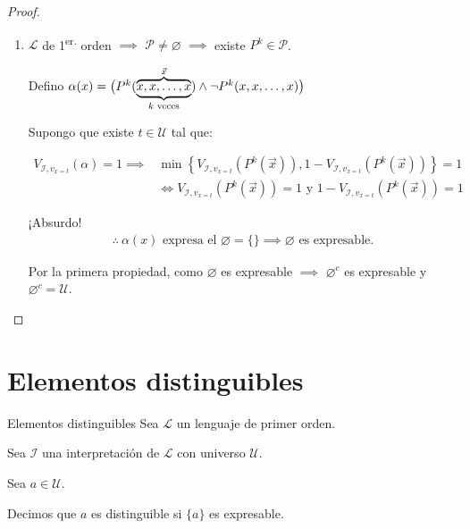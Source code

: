 \begin{proof}
\begin{enumerate}
            \item $\mathcal{L}$ de 1\textsuperscript{er.} orden $\implies$
                $\mathcal{P} \neq \varnothing$ $\implies$ existe 
                $P^k \in \mathcal{P}$.

                Defino $\alpha(x) = \big(
                    P^k ( \overbrace{%
                    \underbrace{x,x,\dotsc,x}_{k\text{ veces}}}^{\vec{x}} )
                    \wedge 
                    \neg P^k (x, x, \dotsc,x) \big)$

                Supongo que existe $t \in \mathcal{U}$ tal que:

                \begin{align*}
                    V_{\mathcal{I}, v_{x=t}}(\alpha)=1 \implies&
                    \min{\left\{ V_{\mathcal{I}, v_{x=t}} \left(P^k(\vec{x})\right), 
                    1 - V_{\mathcal{I}, v_{x=t}}\left(P^k(\vec{x})\right)
                    \right\}} = 1 \\
                    &\iff V_{\mathcal{I}, v_{x=t}} \left(P^k(\vec{x})\right)=1 
                    \text{ y }
                    1 - V_{\mathcal{I}, v_{x=t}}\left(P^k(\vec{x})\right) = 1
                \end{align*}

                ¡Absurdo!
                \begin{gather*}
                    \therefore ~ \alpha(x) \text{ expresa el } \varnothing = \{\}
                    \implies \varnothing \text{ es expresable.}
                \end{gather*}

                Por la primera propiedad, como $\varnothing$ es expresable
                $\implies$ $\varnothing^c$ es expresable y 
                $\varnothing^c=\mathcal{U}$.
        \end{enumerate}
    \end{proof}

    \section{Elementos distinguibles}
    \begin{definicion}{Elementos distinguibles}{}
        Sea $\mathcal{L}$ un lenguaje de primer orden.

        Sea $\mathcal{I}$ una interpretación de $\mathcal{L}$ con universo 
        $\mathcal{U}$.

        Sea $a \in \mathcal{U}$.

        \medskip

        Decimos que $a$ es distinguible si $\{ a \}$ es expresable.
    \end{definicion}



